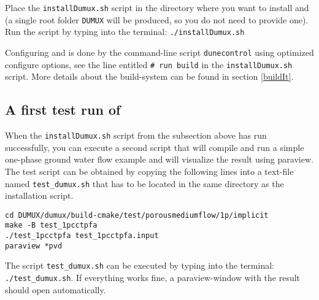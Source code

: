 Place the \texttt{installDumux.sh} script in the directory where you want to install \Dumux and \Dune (a single
root folder \texttt{DUMUX} will be produced, so you do not need to provide one).
Run the script by typing into the terminal: \texttt{./installDumux.sh}

Configuring \Dune and \Dumux is done by the command-line script \texttt{dunecontrol}
using optimized configure options, see the line entitled \texttt{\# run build} in the \texttt{installDumux.sh} script. 
More details about the build-system can be found in section \ref{buildIt}.

\subsection{A first test run of \Dumux}
When the \texttt{installDumux.sh} script from the subsection above has run successfully, you can execute a second script that
will compile and run a simple one-phase ground water flow example and will visualize the result using paraview.
The test script can be obtained by copying the following lines into a text-file named \texttt{test\_dumux.sh}
that has to be located in the same directory as the installation script.
\begin{lstlisting}[style=DumuxCode]
cd DUMUX/dumux/build-cmake/test/porousmediumflow/1p/implicit
make -B test_1pcctpfa
./test_1pcctpfa test_1pcctpfa.input
paraview *pvd
\end{lstlisting}
The script \texttt{test\_dumux.sh} can be executed by typing into the terminal: \texttt{./test\_dumux.sh}.
If everything works fine, a paraview-window with the result should open automatically.
